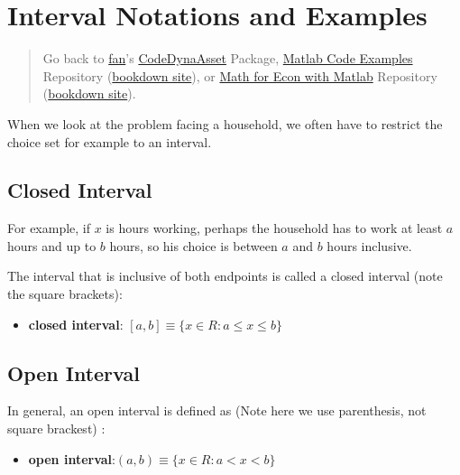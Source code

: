 \documentclass[
]{book}
\providecommand{\tightlist}{%
  \setlength{\itemsep}{0pt}\setlength{\parskip}{0pt}}
\begin{document}
\hypertarget{interval-notations-and-examples}{%
\section{Interval Notations and Examples}\label{interval-notations-and-examples}}

\begin{quote}
Go back to \href{http://fanwangecon.github.io/}{fan}'s \href{https://fanwangecon.github.io/CodeDynaAsset/}{CodeDynaAsset} Package, \href{https://fanwangecon.github.io/M4Econ/}{Matlab Code Examples} Repository (\href{https://fanwangecon.github.io/M4Econ/bookdown}{bookdown site}), or \href{https://fanwangecon.github.io/Math4Econ/}{Math for Econ with Matlab} Repository (\href{https://fanwangecon.github.io/Math4Econ/bookdown}{bookdown site}).
\end{quote}

When we look at the problem facing a household, we often have to
restrict the choice set for example to an interval.

\hypertarget{closed-interval}{%
\subsection{Closed Interval}\label{closed-interval}}

For example, if \(x\) is hours working, perhaps the household has to work
at least \(a\) hours and up to \(b\) hours, so his choice is between \(a\) and
\(b\) hours inclusive.

The interval that is inclusive of both endpoints is called a closed
interval (note the square brackets):

\begin{itemize}
\tightlist
\item
  \textbf{closed interval}:
  \(\left\lbrack a,b\right\rbrack \equiv \lbrace x\in {R}:a\le x\le b\rbrace\)
\end{itemize}

\hypertarget{open-interval}{%
\subsection{Open Interval}\label{open-interval}}

In general, an open interval is defined as (Note here we use
parenthesis, not square brackest) :

\begin{itemize}
\tightlist
\item
  \textbf{open
  interval}:\(\left(a,b\right)\equiv \lbrace x\in {R}:a<x<b\rbrace\)
\end{itemize}
\end{document}
